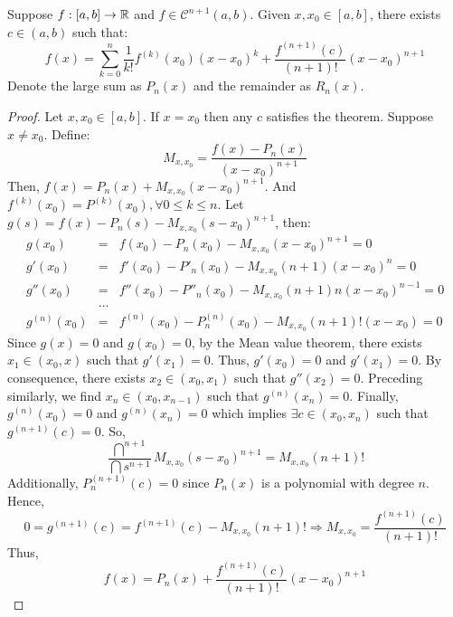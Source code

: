 \begin{theorem}
    Suppose $f: [a,b] \to \mathbb{R}$ and $f \in \mathcal{C}^{n+1}(a,b)$. Given $x, x_0 \in [a,b]$, there exists $c \in (a,b)$ such that:
    \begin{equation}
        f(x) = \sum \limits_{k = 0}^n \frac{1}{k!}f^{(k)}(x_0)(x-x_0)^k + \frac{f^{(n+1)}(c)}{(n+1)!}(x-x_0)^{n+1}
    \end{equation}
    Denote the large sum as $P_n(x)$ and the remainder as $R_n(x)$.
\end{theorem}

\begin{proof}
    Let $x, x_0 \in [a,b]$. If $x = x_0$ then any $c$ satisfies the theorem. Suppose $x \neq x_0$. Define:
    \begin{equation*}
        M_{x, x_0} = \frac{f(x) - P_n(x)}{(x-x_0)^{n+1}}
    \end{equation*}
    Then, $f(x) = P_n(x) + M_{x, x_0}(x-x_0)^{n+1}$. And $f^{(k)}(x_0) = P^{(k)}(x_0), \forall 0 \leq k \leq n$. Let $g(s) = f(x) - P_n(s) - M_{x, x_0}(s-x_0)^{n+1}$, then:
    \begin{eqnarray*}
        g(x_0) &=& f(x_0) - P_n(x_0) - M_{x,x_0}(x-x_0)^{n+1} = 0 \\
        g'(x_0) &=& f'(x_0) - P'_n(x_0) - M_{x,x_0}(n+1)(x-x_0)^{n} = 0 \\
        g''(x_0) &=& f''(x_0) - P''_n(x_0) - M_{x,x_0}(n+1)n(x-x_0)^{n-1} = 0 \\
        &...& \\
        g^{(n)}(x_0) &=& f^{(n)}(x_0) - P^{(n)}_n(x_0) - M_{x,x_0}(n+1)!(x-x_0) = 0
    \end{eqnarray*}
    Since $g(x) = 0$ and $g(x_0) = 0$, by the Mean value theorem, there exists $x_1 \in (x_0, x)$ such that $g'(x_1) = 0$. Thus, $g'(x_0) = 0$ and $g'(x_1) = 0$. By consequence, there exists $x_2 \in (x_0, x_1)$ such that $g''(x_2) = 0$. Preceding similarly, we find $x_n \in (x_0, x_{n-1})$ such that $g^{(n)}(x_n) = 0$. Finally, $g^{(n)}(x_0) = 0$ and $g^{(n)}(x_n) = 0$ which implies $\exists c \in (x_0, x_n)$ such that $g^{(n+1)}(c) = 0$. So,
    \begin{equation*}
        \frac{\dint ^{n+1}}{\dint s^{n+1}} M_{x, x_0}(s - x_0)^{n+1} = M_{x, x_0}(n+1)!
    \end{equation*}
    Additionally, $P_n^{(n+1)}(c) = 0$ since $P_n(x)$ is a polynomial with degree $n$. Hence,
    \begin{equation*}
        0 = g^{(n+1)}(c) = f^{(n+1)}(c) - M_{x, x_0}(n+1)! \Longrightarrow M_{x, x_0} = \frac{f^{(n+1)}(c)}{(n+1)!}
    \end{equation*}
    Thus,
    \begin{equation*}
        f(x) = P_n(x) + \frac{f^{(n+1)}(c)}{(n+1)!}(x-x_0)^{n+1}
    \end{equation*}
\end{proof}

